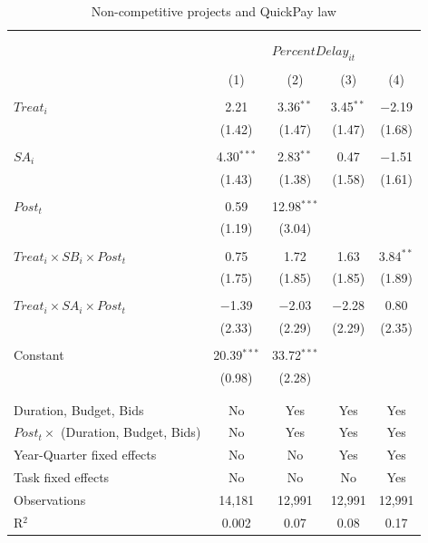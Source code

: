 \documentclass[
]{article}
\begin{document}
\begin{table}[H] \centering 
  \caption{Non-competitive projects and QuickPay law} 
  \label{} 
\small 
\begin{tabular}{@{\extracolsep{-2pt}}lcccc} 
\\[-1.8ex]\hline 
\hline \\[-1.8ex] 
\\[-1.8ex] & \multicolumn{4}{c}{$PercentDelay_{it}$  } \\ 
\\[-1.8ex] & (1) & (2) & (3) & (4)\\ 
\hline \\[-1.8ex] 
 $Treat_i$ & 2.21 & 3.36$^{**}$ & 3.45$^{**}$ & $-$2.19 \\ 
  & (1.42) & (1.47) & (1.47) & (1.68) \\ 
  & & & & \\ 
 $SA_i$ & 4.30$^{***}$ & 2.83$^{**}$ & 0.47 & $-$1.51 \\ 
  & (1.43) & (1.38) & (1.58) & (1.61) \\ 
  & & & & \\ 
 $Post_t$ & 0.59 & 12.98$^{***}$ &  &  \\ 
  & (1.19) & (3.04) &  &  \\ 
  & & & & \\ 
 $Treat_i \times SB_i \times Post_t$ & 0.75 & 1.72 & 1.63 & 3.84$^{**}$ \\ 
  & (1.75) & (1.85) & (1.85) & (1.89) \\ 
  & & & & \\ 
 $Treat_i \times SA_i \times Post_t$ & $-$1.39 & $-$2.03 & $-$2.28 & 0.80 \\ 
  & (2.33) & (2.29) & (2.29) & (2.35) \\ 
  & & & & \\ 
 Constant & 20.39$^{***}$ & 33.72$^{***}$ &  &  \\ 
  & (0.98) & (2.28) &  &  \\ 
  & & & & \\ 
\hline \\[-1.8ex] 
Duration, Budget, Bids & No & Yes & Yes & Yes \\ 
$Post_t \times $  (Duration, Budget, Bids) & No & Yes & Yes & Yes \\ 
Year-Quarter fixed effects & No & No & Yes & Yes \\ 
Task fixed effects & No & No & No & Yes \\ 
Observations & 14,181 & 12,991 & 12,991 & 12,991 \\ 
R$^{2}$ & 0.002 & 0.07 & 0.08 & 0.17 \\ 

\end{tabular}
\end{table}
\end{document}
